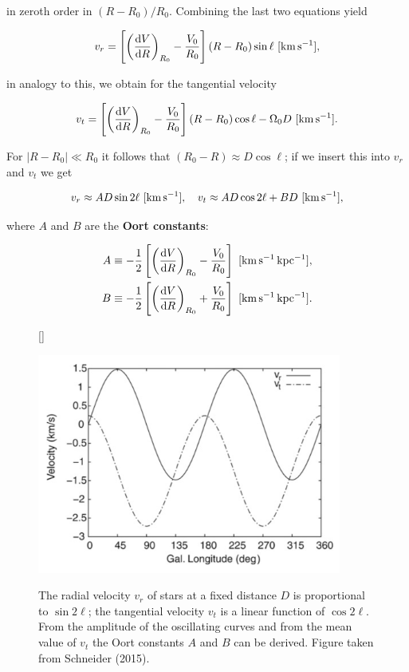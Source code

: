 \documentclass[a4paper,10pt]{article}
\begin{document}
{\noindent}in zeroth order in $(R-R_0)/R_0$. Combining the last two equations yield

\begin{align*}
    v_r = \left[\left(\frac{{\rm d}V}{{\rm d}R}\right)_{R_0} - \frac{V_0}{R_0}\right] (R-R_0)\sin\ell ~ [{\rm km\,s^{-1}}],
\end{align*}

{\noindent}in analogy to this, we obtain for the tangential velocity

\begin{align*}
    v_t = \left[\left(\frac{{\rm d}V}{{\rm d}R}\right)_{R_0} - \frac{V_0}{R_0}\right] (R-R_0)\cos\ell - \Omega_0D ~ [{\rm km\,s^{-1}}].
\end{align*}

{\noindent}For $\lvert R-R_0\rvert\ll R_0$ it follows that $(R_0-R)\approx D\cos\ell$; if we insert this into $v_r$ and $v_t$ we get

\begin{align*}
    v_r \approx AD\sin2\ell ~ [{\rm km\,s^{-1}}], ~~~ v_t \approx AD\cos2\ell+BD ~ [{\rm km\,s^{-1}}],
\end{align*}

{\noindent}where $A$ and $B$ are the \textbf{Oort constants}:

\begin{align*}
    A \equiv -\frac{1}{2} \left[\left(\frac{{\rm d}V}{{\rm d}R}\right)_{R_0} -\frac{V_0}{R_0}\right] ~ [{\rm km\,s^{-1}\,kpc^{-1}}],\\
    B \equiv -\frac{1}{2} \left[\left(\frac{{\rm d}V}{{\rm d}R}\right)_{R_0} +\frac{V_0}{R_0}\right] ~ [{\rm km\,s^{-1}\,kpc^{-1}}].
\end{align*}

\begin{figure}[t]
    [\FBwidth]
    {\caption{\footnotesize{The radial velocity $v_r$ of stars at a fixed distance $D$ is proportional to $\sin2\ell$; the tangential velocity $v_t$ is a linear function of $\cos2\ell$. From the amplitude of the oscillating curves and from the mean value of $v_t$ the Oort constants $A$ and $B$ can be derived. Figure taken from Schneider (2015).}}
    \label{fig:vtvr}}
    {\includegraphics[width=10cm]{figures/vt_vr.png}}
\end{figure}
\end{document}
